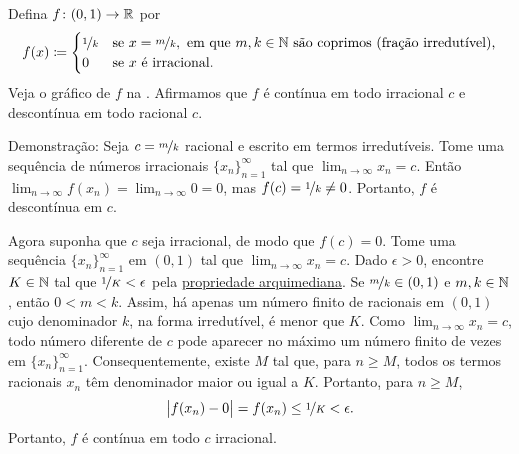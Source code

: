 \begin{example} \label{popcornfunction:example}
Defina $f \colon (0,1) \to {\mathbb{R}}$ por
\begin{equation*}
f(x) \coloneqq 
\begin{cases}
\nicefrac{1}{k} & \text{se } x=\nicefrac{m}{k}, \text{ em que } m,k \in {\mathbb{N}}
\text{ são coprimos (fração irredutível),} \\
0 & \text{se } x \text{ é irracional.}
\end{cases}
\end{equation*}
Veja o gráfico de $f$
na .
Afirmamos que
$f$ é contínua em todo irracional $c$ e
descontínua em todo racional $c$.
\begin{myfigureht}
\caption{Gráfico da \label{popcornfig}}
\end{myfigureht}

Demonstração:
Seja $c = \nicefrac{m}{k}$ racional e escrito em termos irredutíveis. Tome uma sequência de
números irracionais $\{ x_n \}_{n=1}^\infty$ tal que $\lim_{n\to\infty} x_n = c$. Então
$\lim_{n\to\infty} f(x_n) = \lim_{n\to\infty} 0 = 0$, mas $f(c) = \nicefrac{1}{k} \neq 0$.  Portanto, $f$
é descontínua em $c$.

Agora suponha que $c$ seja irracional, de modo que $f(c) = 0$. Tome uma sequência
$\{ x_n \}_{n=1}^\infty$ em $(0,1)$ tal que $\lim_{n\to\infty} x_n = c$.
Dado $\epsilon > 0$, encontre $K \in {\mathbb{N}}$ tal
que $\nicefrac{1}{K} < \epsilon$
pela \hyperref[thm:arch:i]{propriedade arquimediana}.
Se $\nicefrac{m}{k} \in (0,1)$ e $m,k \in {\mathbb{N}}$, então $0 < m < k$.
Assim, há apenas um número finito de racionais em $(0,1)$
cujo denominador $k$, na forma irredutível, é menor que $K$.
Como $\lim_{n\to\infty} x_n = c$, todo número diferente de $c$ pode aparecer no máximo
um número finito de vezes em $\{ x_n \}_{n=1}^\infty$.
Consequentemente,
existe $M$ tal que, para $n \geq M$, todos os termos racionais $x_n$
têm denominador maior ou igual a $K$. Portanto, para $n \geq M$,
\begin{equation*}
\bigl\lvert {f(x_n) - 0} \bigr\rvert = f(x_n) \leq \nicefrac{1}{K} < \epsilon .
\end{equation*}
Portanto, $f$ é contínua em todo $c$ irracional.
\end{example}

